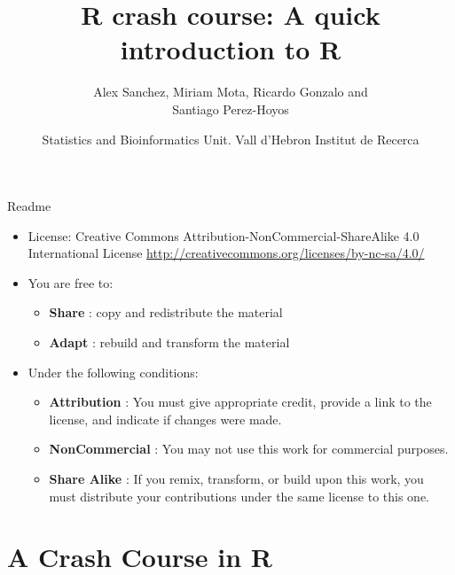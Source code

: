 \documentclass[
  ignorenonframetext,
]{beamer}
\title{R crash course: A quick introduction to R}
\author{Alex Sanchez, Miriam Mota, Ricardo Gonzalo and\\
Santiago Perez-Hoyos}
\date{Statistics and Bioinformatics Unit. Vall d'Hebron Institut de
Recerca}
\providecommand{\tightlist}{%
  \setlength{\itemsep}{0pt}\setlength{\parskip}{0pt}}
\begin{document}
\frame{\titlepage}

\begin{frame}{Readme}
\protect\hypertarget{readme}{}
\begin{itemize}
\item
  License: Creative Commons Attribution-NonCommercial-ShareAlike 4.0
  International License
  \url{http://creativecommons.org/licenses/by-nc-sa/4.0/}
\item
  You are free to:

  \begin{itemize}
  \tightlist
  \item
    \textbf{Share} : copy and redistribute the material
  \item
    \textbf{Adapt} : rebuild and transform the material
  \end{itemize}
\item
  Under the following conditions:

  \begin{itemize}
  \tightlist
  \item
    \textbf{Attribution} : You must give appropriate credit, provide a
    link to the license, and indicate if changes were made.
  \item
    \textbf{NonCommercial} : You may not use this work for commercial
    purposes.
  \item
    \textbf{Share Alike} : If you remix, transform, or build upon this
    work, you must distribute your contributions under the same license
    to this one.
  \end{itemize}
\end{itemize}
\end{frame}

\hypertarget{a-crash-course-in-r}{%
\section{A Crash Course in R}\label{a-crash-course-in-r}}
\end{document}
